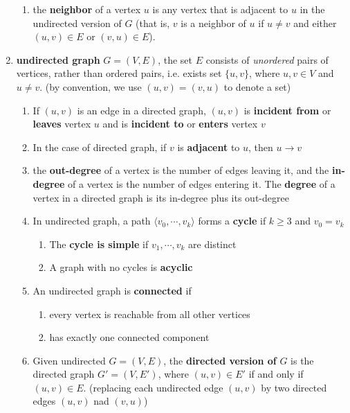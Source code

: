 \documentclass[11pt]{article}
\begin{document}
\begin{defn*}
\begin{enumerate}
\begin{enumerate}
            \item the \textbf{neighbor} of a vertex $u$ is any vertex that is adjacent to $u$ in the undirected version of $G$ (that is, $v$ is a neighbor of $u$ if $u\neq v$ and either $(u,v)\in E$ or $(v,u)\in E$).
        \end{enumerate}
        \item \textbf{undirected graph} $G = (V, E)$, the set $E$ consists of \textit{unordered} pairs of vertices, rather than ordered pairs, i.e. exists set $\{ u, v\}$, where $u, v \in V$ and $u \neq v$. (by convention, we use $(u,v) = (v, u)$ to denote a set)
        \begin{enumerate}
            \item If $(u,v)$ is an edge in a directed graph, $(u,v)$ is \textbf{incident from} or \textbf{leaves} vertex $u$ and is \textbf{incident to} or \textbf{enters} vertex $v$
            \item In the case of directed graph, if $v$ is \textbf{adjacent} to $u$, then $u \to v$
            \item the \textbf{out-degree} of a vertex is the number of edges leaving it, and the \textbf{in-degree} of a vertex is the number of edges entering it. The \textbf{degree} of a vertex in a directed graph is its in-degree plus its out-degree
            \item In undirected graph, a path $\langle v_0, \cdots, v_k \rangle$ forms a \textbf{cycle} if $k\geq 3$ and $v_0 = v_k$ 
            \begin{enumerate}
                \item The \textbf{cycle is simple} if $v_1, \cdots, v_k$ are distinct 
                \item A graph with no cycles is \textbf{acyclic}
            \end{enumerate}
            \item An undirected graph is \textbf{connected} if 
            \begin{enumerate}
                \item every vertex is reachable from all other vertices 
                \item has exactly one connected component 
            \end{enumerate}
            \item Given undirected $G = (V,E)$, the \textbf{directed version of} $G$ is the directed graph $G' = (V, E')$, where $(u,v) \in E'$ if and only if $(u,v)\in E$. (replacing each undirected edge $(u,v)$ by two directed edges $(u,v)$ nad $(v,u)$)

\end{enumerate}
\end{enumerate}
\end{defn*}
\end{document}
